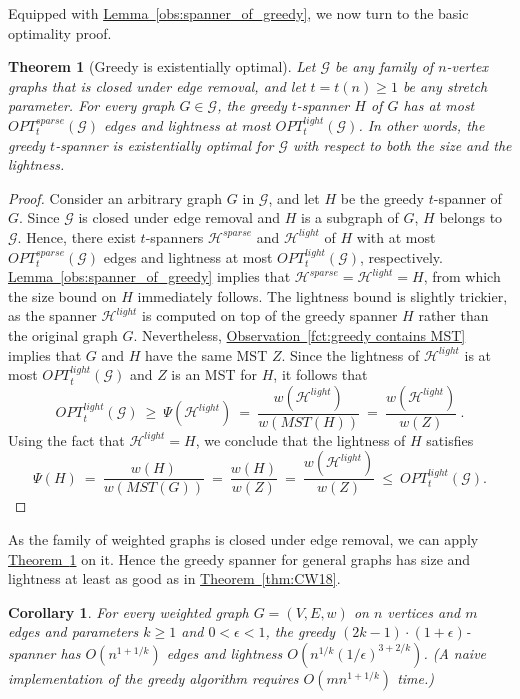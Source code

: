 \documentclass[11pt,letterpaper]{article}
\newtheorem{theorem}{Theorem}
\newtheorem{corollary}{Corollary}
\newcommand{\eps}{\epsilon}
\newcommand{\namedref}[2]{\hyperref[#2]{#1~\ref*{#2}}}
\newcommand{\theoremref}[1]{\namedref{Theorem}{#1}}
\newcommand{\lemmaref}[1]{\namedref{Lemma}{#1}}
\newcommand{\observationref}[1]{\namedref{Observation}{#1}}
\begin{document}
Equipped with \lemmaref{obs:spanner_of_greedy}, we now turn to the basic optimality proof.
\begin{theorem}[Greedy is existentially optimal]\label{thm:main}
	Let $\mathcal{G}$ be any family of $n$-vertex graphs that is closed under edge
	removal, and let $t = t(n) \ge 1$ be any stretch parameter.
	For every graph $G\in\mathcal{G}$,	the greedy $t$-spanner $H$ of $G$ has at most $OPT^{sparse}_t(\mathcal{G})$ edges and lightness at most $OPT^{light}_t(\mathcal{G})$.
	In other words, the greedy $t$-spanner is existentially optimal for $\mathcal{G}$ with respect to both the size and the lightness.
\end{theorem}
\begin{proof}
	Consider an arbitrary graph $G$ in $\mathcal{G}$, and let $H$ be the greedy $t$-spanner of $G$.
	Since $\mathcal{G}$ is closed under edge removal and $H$ is a subgraph of $G$,  $H$ belongs to $\mathcal{G}$.
	Hence, there exist $t$-spanners $\mathcal{H}^{sparse}$ and $\mathcal{H}^{light}$ of $H$ with at most $OPT^{sparse}_t(\mathcal{G})$  edges and lightness at most $OPT^{light}_t(\mathcal{G})$, respectively.
	\lemmaref{obs:spanner_of_greedy} implies that $\mathcal{H}^{sparse}=\mathcal{H}^{light}=H$, from which the size bound on $H$ immediately follows. 
	The lightness bound is slightly trickier, as the spanner $\mathcal{H}^{light}$ is computed on top of the greedy spanner $H$ rather than the original graph $G$.
	Nevertheless, \observationref{fct:greedy contains MST} implies that $G$ and $H$ have the same MST $Z$.
	Since the lightness of $\mathcal{H}^{light}$ is at most $OPT^{light}_t(\mathcal{G})$ and $Z$ is an MST for $H$, it follows that
	$$OPT^{light}_t(\mathcal{G}) ~\ge~ \Psi(\mathcal{H}^{light}) ~=~ \frac{w(\mathcal{H}^{light})}{w(MST(H))} ~=~ \frac{w(\mathcal{H}^{light})}{w(Z)}~.$$
	Using the fact that $\mathcal{H}^{light}= H$, we conclude that the lightness of $H$ satisfies
	$$\Psi(H) ~=~ \frac{w(H)}{w(MST(G))}  ~=~ \frac{w(H)}{w(Z)} ~=~ \frac{w(\mathcal{H}^{light})}{w(Z)} ~\le~
	OPT^{light}_t(\mathcal{G}).$$
\end{proof}

As the family of weighted graphs is closed under edge removal, we can apply \theoremref{thm:main} on it.
Hence the greedy spanner for general graphs has size and lightness at least as good as in \theoremref{thm:CW18}.
\begin{corollary}\label{cor:Greedy_CW}
	For every weighted graph $G=(V,E,w)$ on $n$ vertices and $m$ edges and parameters $k\ge 1$ and $0<\epsilon<1$, the greedy
	$(2k-1)\cdot(1+\epsilon)$-spanner has $O(n^{1+1/k})$ edges and lightness $O(n^{1/k} (1/\eps)^{3+2/k})$.
	(A naive implementation of the greedy algorithm requires $O(m n^{1+1/k})$ time.)
\end{corollary}	
\end{document}
